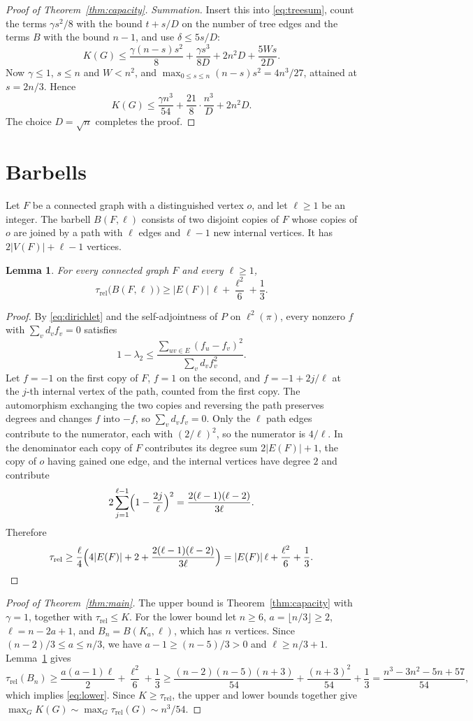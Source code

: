\documentclass[11pt]{amsart}
\numberwithin{equation}{section}
\newtheorem{lemma}[theorem]{Lemma}
\theoremstyle{remark}
\newcommand{\trel}{\tau_{\mathrm{rel}}}
\begin{document}
\begin{proof}[Proof of Theorem~\ref{thm:capacity}]
\emph{Summation.} Insert this into \eqref{eq:treesum}, count the terms $\gamma s^2/8$ with the bound $t+s/D$ on the number of tree edges and the terms $B$ with the bound $n-1$, and use $\delta\le5s/D$:
\[
K(G)\le\frac{\gamma(n-s)s^2}8+\frac{\gamma s^3}{8D}+2n^2D+\frac{5Ws}{2D}.
\]
Now $\gamma\le1$, $s\le n$ and $W<n^2$, and $\max_{0\le s\le n}(n-s)s^2=4n^3/27$, attained at $s=2n/3$. Hence
\[
K(G)\le\frac{\gamma n^3}{54}+\frac{21}{8}\cdot\frac{n^3}D+2n^2D .
\]
The choice $D=\sqrt n$ completes the proof.
\end{proof}

\section{Barbells}\label{sec:barbells}
Let $F$ be a connected graph with a distinguished vertex $o$, and let $\ell\ge1$ be an integer. The barbell $B(F,\ell)$ consists of two disjoint copies of $F$ whose copies of $o$ are joined by a path with $\ell$ edges and $\ell-1$ new internal vertices. It has $2|V(F)|+\ell-1$ vertices.

\begin{lemma}\label{lem:barbell}
For every connected graph $F$ and every $\ell\ge1$,
\[
\trel\bigl(B(F,\ell)\bigr)\ge|E(F)|\,\ell+\frac{\ell^2}6+\frac13 .
\]
\end{lemma}

\begin{proof}
By \eqref{eq:dirichlet} and the self-adjointness of $P$ on $\ell^2(\pi)$, every nonzero $f$ with $\sum_vd_vf_v=0$ satisfies
\[
1-\lambda_2\le\frac{\sum_{uv\in E}(f_u-f_v)^2}{\sum_vd_vf_v^2}.
\]
Let $f=-1$ on the first copy of $F$, $f=1$ on the second, and $f=-1+2j/\ell$ at the $j$-th internal vertex of the path, counted from the first copy. The automorphism exchanging the two copies and reversing the path preserves degrees and changes $f$ into $-f$, so $\sum_vd_vf_v=0$. Only the $\ell$ path edges contribute to the numerator, each with $(2/\ell)^2$, so the numerator is $4/\ell$. In the denominator each copy of $F$ contributes its degree sum $2|E(F)|+1$, the copy of $o$ having gained one edge, and the internal vertices have degree $2$ and contribute
\[
2\sum_{j=1}^{\ell-1}\Bigl(1-\frac{2j}\ell\Bigr)^2=\frac{2(\ell-1)(\ell-2)}{3\ell}.
\]
Therefore
\[
\trel\ge\frac\ell4\Bigl(4|E(F)|+2+\frac{2(\ell-1)(\ell-2)}{3\ell}\Bigr)=|E(F)|\,\ell+\frac{\ell^2}6+\frac13 .\qedhere
\]
\end{proof}

\begin{proof}[Proof of Theorem~\ref{thm:main}]
The upper bound is Theorem~\ref{thm:capacity} with $\gamma=1$, together with $\trel\le K$. For the lower bound let $n\ge6$, $a=\lfloor n/3\rfloor\ge2$, $\ell=n-2a+1$, and $B_n=B(K_a,\ell)$, which has $n$ vertices. Since $(n-2)/3\le a\le n/3$, we have $a-1\ge(n-5)/3>0$ and $\ell\ge n/3+1$. Lemma~\ref{lem:barbell} gives
\[
\trel(B_n)\ge\frac{a(a-1)\ell}2+\frac{\ell^2}6+\frac13\ge\frac{(n-2)(n-5)(n+3)}{54}+\frac{(n+3)^2}{54}+\frac13=\frac{n^3-3n^2-5n+57}{54},
\]
which implies \eqref{eq:lower}. Since $K\ge\trel$, the upper and lower bounds together give $\max_GK(G)\sim\max_G\trel(G)\sim n^3/54$.
\end{proof}
\end{document}
